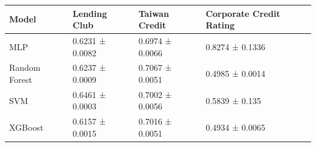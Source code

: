 \begin{tabular}{llll}
\toprule
Model & Lending Club & Taiwan Credit & Corporate Credit Rating \\
\midrule
MLP & 0.6231 ± 0.0082 & 0.6974 ± 0.0066 & 0.8274 ± 0.1336 \\
Random Forest & 0.6237 ± 0.0009 & 0.7067 ± 0.0051 & 0.4985 ± 0.0014 \\
SVM & 0.6461 ± 0.0003 & 0.7002 ± 0.0056 & 0.5839 ± 0.135 \\
XGBoost & 0.6157 ± 0.0015 & 0.7016 ± 0.0051 & 0.4934 ± 0.0065 \\
\bottomrule
\end{tabular}
